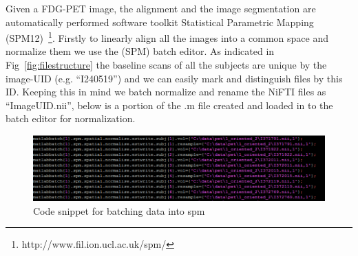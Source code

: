 Given a FDG-PET image, the alignment and the image segmentation are automatically performed  software toolkit Statistical Parametric Mapping (SPM12)~\citep{penny2011statistical}\footnote{http://www.fil.ion.ucl.ac.uk/spm/}. Firstly to linearly align all the images into a common space and normalize them we use the (SPM) batch editor. As indicated in Fig~\ref{fig:filestructure} the baseline scans of all the subjects are unique by the image-UID (e.g. ``I240519'') and we can easily mark and distinguish files by this ID. Keeping this in mind we batch normalize and rename the NiFTI files as ``ImageUID.nii'', below is a portion of the .m file created and loaded in to the batch editor for normalization. 
\begin{figure}[h]
	\centering
	\includegraphics[width=\linewidth]{figures/batching}
	\caption[Code snippet for batching data into spm]{Code snippet for batching data into spm}
	\label{fig:batching}
\end{figure}

